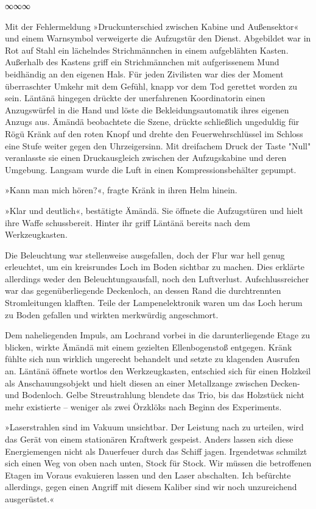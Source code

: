 \begin{center}
	∞∞∞
\end{center}

Mit der Fehlermeldung »Druckunterschied zwischen Kabine und Außensektor« und einem Warnsymbol verweigerte die Aufzugstür den Dienst. Abgebildet war in Rot auf Stahl ein lächelndes Strichmännchen in einem aufgeblähten Kasten. Außerhalb des Kastens griff ein Strichmännchen mit aufgerissenem Mund beidhändig an den eigenen Hals. Für jeden Zivilisten war dies der Moment überraschter Umkehr mit dem Gefühl, knapp vor dem Tod gerettet worden zu sein. Läntänä hingegen drückte der unerfahrenen Koordinatorin einen Anzugswürfel in die Hand und löste die Bekleidungsautomatik ihres eigenen Anzugs aus. Ämändä beobachtete die Szene, drückte schließlich ungeduldig für Rögü Kränk auf den roten Knopf und drehte den Feuerwehrschlüssel im Schloss eine Stufe weiter gegen den Uhrzeigersinn. Mit dreifachem Druck der Taste "Null" veranlasste sie einen Druckausgleich zwischen der Aufzugskabine und deren Umgebung. Langsam wurde die Luft in einen Kompressionsbehälter gepumpt.

»Kann man mich hören?«, fragte Kränk in ihren Helm hinein.

»Klar und deutlich«, bestätigte Ämändä. Sie öffnete die Aufzugstüren und hielt ihre Waffe schussbereit. Hinter ihr griff Läntänä bereits nach dem Werkzeugkasten.

Die Beleuchtung war stellenweise ausgefallen, doch der Flur war hell genug erleuchtet, um ein kreisrundes Loch im Boden sichtbar zu machen. Dies erklärte allerdings weder den Beleuchtungsausfall, noch den Luftverlust. Aufschlussreicher war das gegenüberliegende Deckenloch, an dessen Rand die durchtrennten Stromleitungen klafften. Teile der Lampenelektronik waren um das Loch herum zu Boden gefallen und wirkten merkwürdig angeschmort.

Dem naheliegenden Impuls, am Lochrand vorbei in die darunterliegende Etage zu blicken, wirkte Ämändä mit einem gezielten Ellenbogenstoß entgegen. Kränk fühlte sich nun wirklich ungerecht behandelt und setzte zu klagenden Ausrufen an. Läntänä öffnete wortlos den Werkzeugkasten, entschied sich für einen Holzkeil als Anschauungsobjekt und hielt diesen an einer Metallzange zwischen Decken- und Bodenloch. Gelbe Streustrahlung blendete das Trio, bis das Holzstück nicht mehr existierte – weniger als zwei Örzklöks nach Beginn des Experiments.

»Laserstrahlen sind im Vakuum unsichtbar. Der Leistung nach zu urteilen, wird das Gerät von einem stationären Kraftwerk gespeist. Anders lassen sich diese Energiemengen nicht als Dauerfeuer durch das Schiff jagen. Irgendetwas schmilzt sich einen Weg von oben nach unten, Stock für Stock. Wir müssen die betroffenen Etagen im Voraus evakuieren lassen und den Laser abschalten. Ich befürchte allerdings, gegen einen Angriff mit diesem Kaliber sind wir noch unzureichend ausgerüstet.«

